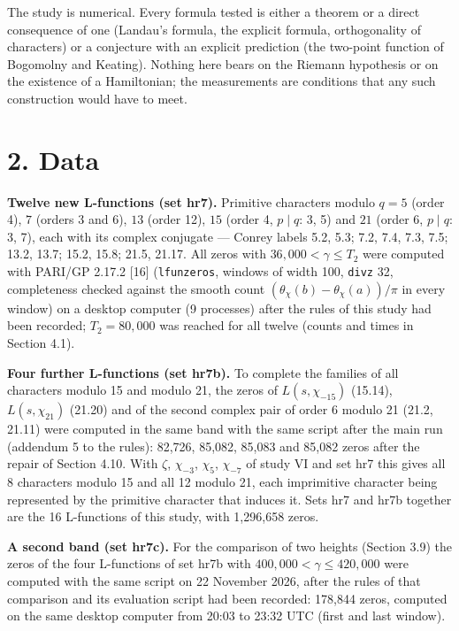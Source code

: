 \documentclass[
  10pt,
]{article}
\begin{document}
The study is numerical. Every formula tested is either a theorem or a
direct consequence of one (Landau's formula, the explicit formula,
orthogonality of characters) or a conjecture with an explicit prediction
(the two-point function of Bogomolny and Keating). Nothing here bears on
the Riemann hypothesis or on the existence of a Hamiltonian; the
measurements are conditions that any such construction would have to
meet.

\hypertarget{data}{%
\section{2. Data}\label{data}}

\textbf{Twelve new L-functions (set hr7).} Primitive characters modulo
\(q = 5\) (order 4), \(7\) (orders 3 and 6), \(13\) (order 12), \(15\)
(order 4, \(p \mid q\): 3, 5) and \(21\) (order 6, \(p \mid q\): 3, 7),
each with its complex conjugate --- Conrey labels 5.2, 5.3; 7.2, 7.4,
7.3, 7.5; 13.2, 13.7; 15.2, 15.8; 21.5, 21.17. All zeros with
\(36{,}000 < \gamma \le T_2\) were computed with PARI/GP 2.17.2 {[}16{]}
(\texttt{lfunzeros}, windows of width 100, \texttt{divz} 32,
completeness checked against the smooth count
\((\theta_\chi(b) - \theta_\chi(a))/\pi\) in every window) on a desktop
computer (9 processes) after the rules of this study had been recorded;
\(T_2 = 80{,}000\) was reached for all twelve (counts and times in
Section 4.1).

\textbf{Four further L-functions (set hr7b).} To complete the families
of all characters modulo 15 and modulo 21, the zeros of
\(L(s, \chi_{-15})\) (15.14), \(L(s, \chi_{21})\) (21.20) and of the
second complex pair of order 6 modulo 21 (21.2, 21.11) were computed in
the same band with the same script after the main run (addendum 5 to the
rules): 82,726, 85,082, 85,083 and 85,082 zeros after the repair of
Section 4.10. With \(\zeta\), \(\chi_{-3}\), \(\chi_5\), \(\chi_{-7}\)
of study VI and set hr7 this gives all 8 characters modulo 15 and all 12
modulo 21, each imprimitive character being represented by the primitive
character that induces it. Sets hr7 and hr7b together are the 16
L-functions of this study, with 1,296,658 zeros.

\textbf{A second band (set hr7c).} For the comparison of two heights
(Section 3.9) the zeros of the four L-functions of set hr7b with
\(400{,}000 < \gamma \le 420{,}000\) were computed with the same script
on 22 November 2026, after the rules of that comparison and its
evaluation script had been recorded: 178,844 zeros, computed on the same
desktop computer from 20:03 to 23:32 UTC (first and last window).
\end{document}
